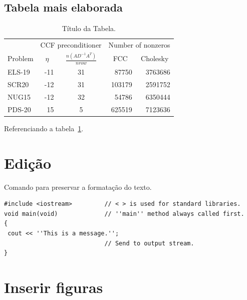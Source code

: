 \documentclass[12pt,fleqn]{article}
\begin{document}
\subsection{Tabela mais elaborada}
\begin{table}[htb]
\begin{center}
\begin{tabular}{|l|r|c|r|r|} \hline
            & \multicolumn{2}{|c|}{{CCF preconditioner}} & \multicolumn{2}{|c|}{{Number of nonzeros}} \\ \cline{2-5}
{Problem}   & \multicolumn{1}{|c|}{$\eta$}  & \multicolumn{1}{|c|}{$ \frac{n(AD^{-1}A^T)}{nrow}$} & \multicolumn{1}{|c|}{FCC} & \multicolumn{1}{|c|}{Cholesky}  \\ \hline \hline
ELS-19    &  -11 & 31 &  87750  & 3763686  \\\hline
SCR20     &  -12 & 31 &  103179 & 2591752  \\\hline
NUG15     &  -12 & 32 &  54786  & 6350444 \\\hline
PDS-20    &   15 & 5  &  625519 & 7123636\\\hline
\end{tabular}
\caption{Título da Tabela.}
\label{tabn}
\end{center}
\end{table}

Referenciando a tabela~\ref{tabn}.

\section{Edição}

Comando para preservar a formatação do texto.
\begin{verbatim}
#include <iostream>         // < > is used for standard libraries.
void main(void)             // ''main'' method always called first.
{
 cout << ''This is a message.'';
                            // Send to output stream.
}
\end{verbatim}

\section{Inserir figuras}
\end{document}
